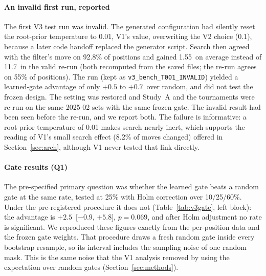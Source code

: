 \paragraph*{An invalid first run, reported}
The first V3 test run was invalid. The generated configuration had silently reset the root-prior temperature to 0.01, V1's value, overwriting the V2 choice (0.1), because a later code handoff replaced the generator script. Search then agreed with the filter's move on 92.8\% of positions and gained 1.55\cp\ on average instead of 11.7\cp\ in the valid re-run (both recomputed from the saved files; the re-run agrees on 55\% of positions). The run (kept as \texttt{v3\_bench\_T001\_INVALID}) yielded a learned-gate advantage of only $+0.5$ to $+0.7$\cp\ over random, and did not test the frozen design. The setting was restored and Study~A and the tournaments were re-run on the same 2025-02 sets with the same frozen gate. The invalid result had been seen before the re-run, and we report both. The failure is informative: a root-prior temperature of 0.01 makes search nearly inert, which supports the reading of V1's small search effect (8.2\% of moves changed) offered in Section~\ref{sec:arch}, although V1 never tested that link directly.

\paragraph*{Gate results (Q1)}
The pre-specified primary question was whether the learned gate beats a random gate at the same rate, tested at 25\% with Holm correction over 10/25/60\%. Under the pre-registered procedure it does not (Table~\ref{tab:v3gate}, left block): the advantage is $+2.5$\cp\ [$-0.9$, $+5.8$], $p=0.069$, and after Holm adjustment no rate is significant. We reproduced these figures exactly from the per-position data and the frozen gate weights. That procedure draws a fresh random gate inside every bootstrap resample, so its interval includes the sampling noise of one random mask. This is the same noise that the V1 analysis removed by using the expectation over random gates (Section~\ref{sec:methods}).

